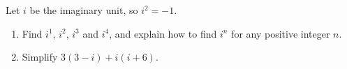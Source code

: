 Let $i$ be the imaginary unit, so $i^2=-1$.
\begin{enumerate}
\item[(a)] Find $i^1$, $i^2$, $i^3$ and $i^4$, and explain how to find $i^n$ for any positive integer $n$.
\item[(b)] Simplify $3(3-i)+i(i+6)$.
\end{enumerate}
